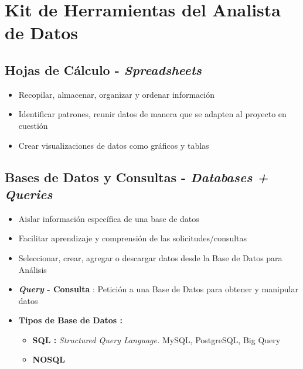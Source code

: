 \section {Kit de Herramientas del Analista de Datos}

\subsection{Hojas de Cálculo - \textit{Spreadsheets}}
\begin{itemize}
    \item {Recopilar, almacenar, organizar y ordenar información}
    \item {Identificar patrones, reunir datos de manera que se adapten al proyecto en cuestión}
    \item {Crear visualizaciones de datos como gráficos y tablas}
\end{itemize}

\subsection{Bases de Datos y Consultas - \textit{Databases + Queries}}
\begin{itemize}
    \item {Aislar información específica de una base de datos}
    \item {Facilitar aprendizaje y comprensión de las solicitudes/consultas}
    \item {Seleccionar, crear, agregar o descargar datos desde la Base de Datos para Análisis}
    \item {\textbf{\textit{Query} - Consulta} : Petición a una Base de Datos para obtener y manipular datos}
    \item {\textbf{Tipos de Base de Datos : }
    \begin{itemize}
        \item {\textbf{SQL : }\textit{Structured Query Language.} MySQL, PostgreSQL, Big Query}
        \item {\textbf{NOSQL}}
    \end{itemize}}
\end{itemize}

